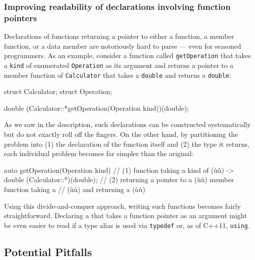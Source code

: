 \subsubsection[Improving readability of declarations involving function pointers]{Improving readability of declarations involving function pointers}\label{improving-readability-of-declarations-involving-function-pointers}

Declarations of functions returning a pointer to either a function, a member function, or a data member are notoriously hard to parse --- even for seasoned programmers. As an example, consider a function called
\lstinline!getOperation! that takes a \lstinline!kind! of
enumerated \lstinline!Operation! as its argument and returns a pointer to a member
function of \lstinline!Calculator! that takes a \lstinline!double! and
returns a \lstinline!double!:

\begin{emcppshiddenlisting}[emcppsbatch=e3]
struct Calculator;
struct Operation;
\end{emcppshiddenlisting}
\begin{emcppslisting}[emcppsbatch=e3]
double (Calculator::*getOperation(Operation kind))(double);
\end{emcppslisting}

\noindent As we saw in the description, such declarations can be constructed
systematically but do not exactly roll off the fingers. On the other
hand, by partitioning the problem into (1) the declaration of the
function itself and (2) the type it returns, each individual problem
becomes far simpler than the original:

\begin{emcppslisting}[emcppsbatch=e3]
auto getOperation(Operation kind)  // (1) function taking a kind of (ù{}ù)
    -> double (Calculator::*)(double);
        // (2) returning a pointer to a (ù{}ù) member function taking a
        //     (ù{}ù) and returning a (ù{}ù)
\end{emcppslisting}

\noindent Using this divide-and-conquer approach, writing such functions becomes fairly straightforward. Declaring a  that
takes a function pointer as an argument might be even easier to read
if a type alias is used via \lstinline!typedef! or, as of C++11,
  \lstinline!using!.

\subsection[Potential Pitfalls]{Potential Pitfalls}\label{potential-pitfalls}

